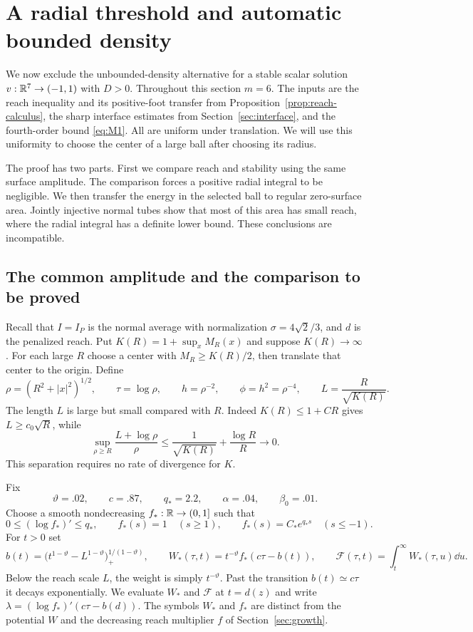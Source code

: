 \section{A radial threshold and automatic bounded density}\label{sec:radial}

We now exclude the unbounded-density alternative for a stable scalar
solution $v:\mathbb R^7\to(-1,1)$ with $D>0$. Throughout this section $m=6$.
The inputs are the reach inequality and its positive-foot transfer from
Proposition~\ref{prop:reach-calculus}, the sharp interface estimates from
Section~\ref{sec:interface}, and the fourth-order bound
\eqref{eq:M1}. All are uniform under translation. We will use this
uniformity to choose the center of a large ball after choosing its radius.

The proof has two parts. First we compare reach and stability using the
same surface amplitude. The comparison forces a positive radial integral
to be negligible. We then transfer the energy in the selected ball to
regular zero-surface area. Jointly injective normal tubes show that most
of this area has small reach, where the radial integral has a definite
lower bound. These conclusions are incompatible.

\subsection{The common amplitude and the comparison to be proved}

Recall that $I=I_P$ is the normal average with normalization
$\sigma=4\sqrt2/3$, and $d$ is the penalized reach. Put
$K(R)=1+\sup_xM_R(x)$ and suppose $K(R)\to\infty$. For each large $R$
choose a center with $M_R\ge K(R)/2$, then translate that center to the
origin. Define
\[
 \rho=(R^2+|x|^2)^{1/2},\qquad \tau=\log\rho,\qquad
 h=\rho^{-2},\qquad \phi=h^2=\rho^{-4},\qquad
 L=\frac{R}{\sqrt{K(R)}}.
\]
The length $L$ is large but small compared with $R$. Indeed
$K(R)\le1+CR$ gives $L\ge c_0\sqrt R$, while
\begin{equation}\label{eq:radial-scale-separation}
 \sup_{\rho\ge R}\frac{L+\log\rho}{\rho}
 \le\frac1{\sqrt{K(R)}}+\frac{\log R}{R}\longrightarrow0.
\end{equation}
This separation requires no rate of divergence for $K$.

Fix
\[
 \vartheta=.02,\qquad c=.87,\qquad q_*=2.2,\qquad
 \alpha=.04,\qquad\beta_0=.01.
\]
Choose a smooth nondecreasing $f_*:\mathbb R\to(0,1]$ such that
\[
 0\le(\log f_*)'\le q_*,\qquad f_*(s)=1\quad(s\ge1),\qquad
 f_*(s)=C_*e^{q_*s}\quad(s\le-1).
\]
For $t>0$ set
\[
 b(t)=\bigl(t^{1-\vartheta}-L^{1-\vartheta}\bigr)_+^{1/(1-\vartheta)},
 \qquad W_*(\tau,t)=t^{-\vartheta}f_*(c\tau-b(t)),\qquad
 \mathcal F(\tau,t)=\int_t^\infty W_*(\tau,u)\dd u.
\]
Below the reach scale $L$, the weight is simply $t^{-\vartheta}$.
Past the transition $b(t)\simeq c\tau$ it decays exponentially.
We evaluate $W_*$ and $\mathcal F$ at $t=d(z)$ and write
$\lambda=(\log f_*)'(c\tau-b(d))$. The symbols $W_*$ and $f_*$
are distinct from the potential $W$ and the decreasing reach multiplier
$f$ of Section~\ref{sec:growth}.


